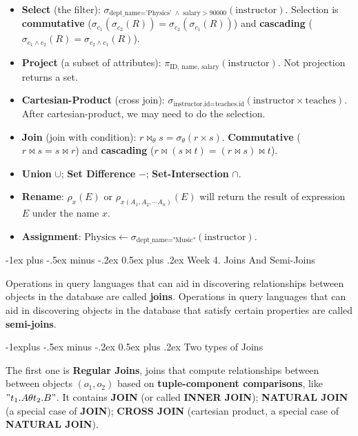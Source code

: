 \documentclass[10pt,landscape]{article}
\makeatletter
\newcommand{\term}[1]{{\color{blue} \textbf{#1}}}
\newcommand{\prpt}[1]{{\color{red} \textbf{#1}}}
\renewcommand{\section}{\@startsection{section}{1}{0mm}%
                                {-1ex plus -.5ex minus -.2ex}%
                                {0.5ex plus .2ex}%
                                {\normalfont\large\bfseries}}
\renewcommand{\subsection}{\@startsection{subsection}{2}{0mm}%
                                {-1explus -.5ex minus -.2ex}%
                                {0.5ex plus .2ex}%
                                {\normalfont\normalsize\bfseries}}
\makeatother
\begin{document}
\begin{multicols}{4}
\begin{itemize}
\item \term{Select} (the filter): $\sigma_{\text{dept\_name='Physics'} \;\land\; \text{salary} >  90000}(\text{instructor})$. Selection is \prpt{commutative} ($\sigma_{c_1} (\sigma_{c_2}(R)) = \sigma_{c_2} (\sigma_{c_1} (R))$) and \prpt{cascading} ($\sigma_{c_1 \land c_2} (R) = \sigma_{c_2 \land c_1} (R)$). 
	\item \term{Project} (a subset of attributes): $\pi_{\text{ID, name, salary}}(\text{instructor})$. Not projection returns a set.
	\item \term{Cartesian-Product} (cross join): $\sigma_{\text{instructor.id=teaches.id}}(\text{instructor}\times\text{teaches})$. After cartesian-product, we may need to do the selection.
	\item \term{Join} (join with condition): $r \bowtie_{\theta} s = \sigma_{\theta} (r \times s)$. \prpt{Commutative} ($r \bowtie s = s \bowtie r$) and \prpt{cascading} ($r \bowtie (s \bowtie t) = (r \bowtie s) \bowtie t$).
	\item \term{Union} $\cup$; \term{Set Difference} $-$; \term{Set-Intersection} $\cap$. 
	\item \term{Rename}: $\rho_x(E)$ or $\rho_{x(A_1, A_2, \cdots A_n)}(E)$ will return the result of expression $E$ under the name $x$.
	\item \term{Assignment}: $\text{Physics} \leftarrow \sigma_{\text{dept\_name="Music"}} (\text{instructor})$.
\end{itemize}

\section{Week 4. Joins And Semi-Joins}

Operations in query languages that can aid in discovering relationships between objects in the database are called \term{joins}. Operations in query languages that can aid in discovering objects in the database that satisfy certain properties are called \term{semi-joins}.

\subsection{Two types of Joins}

The first one is \term{Regular Joins}, joins that compute relationships between between objects $(o_1, o_2)$ based on \textbf{tuple-component comparisons}, like $"t_1.A \theta t_2.B"$. It contains \term{JOIN} (or called \term{INNER JOIN}); \term{NATURAL JOIN} (a special case of \term{JOIN}); \term{CROSS JOIN} (cartesian product, a special case of \term{NATURAL JOIN}).


\end{multicols}
\end{document}
